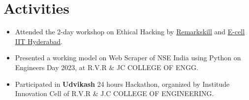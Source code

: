 \documentclass[]{roshan_resume}
\begin{document}
\begin{minipage}[t]{0.66\textwidth}
		\section{Activities}
		\begin{itemize}
			\item Attended the 2-day workshop on Ethical Hacking by \href{https://www.linkedin.com/company/remarkskill-education/about/}{Remarkskill} and \href{https://www.linkedin.com/company/ecell-iith/}{E-cell IIT Hyderabad}.\\
			\item Presented a working model on Web Scraper of NSE India using Python on Engineers Day 2023, at R.V.R \& JC COLLEGE OF ENGG. \\
			\item Participated in \textbf{Udvikash} 24 hours Hackathon, organized by Institude Innovation Cell of R.V.R \& J.C COLLEGE OF ENGINEERING.
		\end{itemize}
		
	\end{minipage} 
\end{document}

